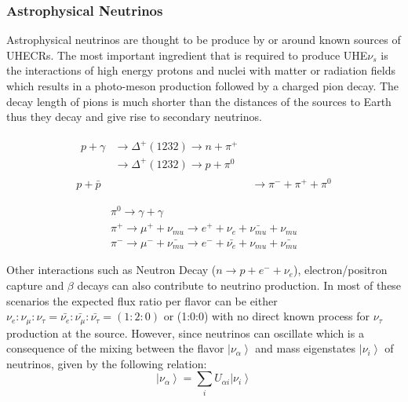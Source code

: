 \subsubsection*{Astrophysical Neutrinos}
\label{subsubsec:AstroNu}

Astrophysical neutrinos are thought to be produce by or around known sources of UHECRs. The most important ingredient that is required to produce UHE$\nu_s$ is the interactions of high energy protons and nuclei with matter or radiation fields which results in a photo-meson production followed by a charged pion decay. The decay length of pions is much shorter than the distances of the sources to Earth thus they decay and give rise to secondary neutrinos. 

\begin{subequations}\label{eq:Nuprod_1}
  \begin{align}
    \begin{split}
      p + \gamma &\longrightarrow \Delta^+(1232 ) \longrightarrow n+\pi^+ \\ 
                      &\longrightarrow \Delta^+(1232 ) \longrightarrow p+\pi^0
    \end{split} \\
      p + \bar{p} &\longrightarrow \pi^- + \pi^+ + \pi^0 
  \end{align}
\end{subequations}

\begin{subequations}\label{eq:Nuprod_2}
  \begin{align}  
    \pi^0 \longrightarrow \gamma + \gamma \\
    \pi^+ \longrightarrow \mu^+ + \nu_{mu} \longrightarrow e^+ + \nu_{e} + \bar{\nu_{mu}} + \nu_{mu} \\
    \pi^- \longrightarrow \mu^- + \bar{\nu_{mu}} \longrightarrow e^- + \bar{\nu_{e}} + \nu_{mu} + \bar{\nu_{mu}}
  \end{align}
\end{subequations}

Other interactions such as Neutron Decay ($n \longrightarrow p + e^- + \nu_{e} $), electron/positron capture and $\beta$ decays can also contribute to neutrino production. In most of these scenarios the expected flux ratio per flavor can be either $ \nu_{e} : \nu_{\mu} : \nu_{\tau} = \bar{\nu_{e}} : \bar{\nu_{\mu}} : \bar{\nu_{\tau}} = (1:2:0) $ or (1:0:0) with no direct known process for $\nu_{\tau}$ production at the source. However, since neutrinos can oscillate which is a consequence of the mixing between the flavor  $\left| \nu_{\alpha} \right\rangle $ and mass eigenstates $\left| \nu_{i} \right\rangle $  of neutrinos, given by the following relation:
\begin{equation}
\left| \nu_{\alpha} \right\rangle  = \sum_i U_{\alpha i} \left| \nu_{i} \right\rangle
\end{equation}

